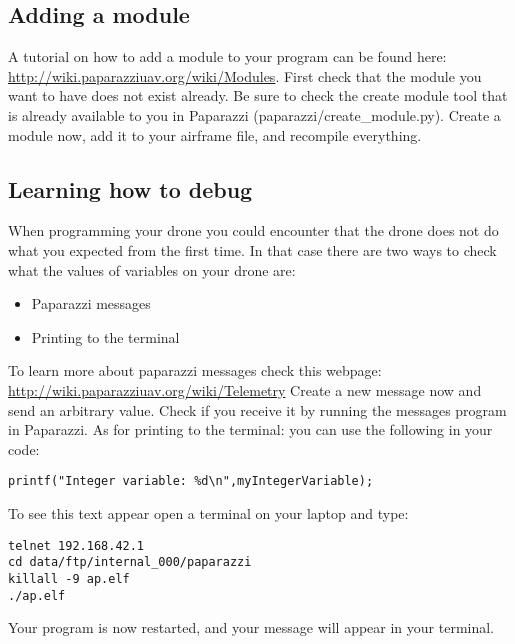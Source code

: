 \documentclass{article}
\begin{document}
\subsection*{Adding a module}
A tutorial on how to add a module to your program can be found here: \url{http://wiki.paparazziuav.org/wiki/Modules}.
First check that the module you want to have does not exist already. Be sure to check the create module tool that is already available to you in Paparazzi (paparazzi/create\_module.py). 
Create a module now, add it to your airframe file, and recompile everything. 

\subsection*{Learning how to debug}
When programming your drone you could encounter that the drone does not do what you expected from the first time. In that case there are two ways to check what the values of variables on your drone are:
\begin{itemize}
	\item Paparazzi messages
	\item Printing to the terminal
\end{itemize}
To learn more about paparazzi messages check this webpage: \url{http://wiki.paparazziuav.org/wiki/Telemetry}
Create a new message now and send an arbitrary value. Check if you receive it by running the messages program in Paparazzi. 
As for printing to the terminal: you can use the following in your code:

\begin{verbatim}
printf("Integer variable: %d\n",myIntegerVariable);
\end{verbatim}
To see this text appear open a terminal on your laptop and type:
\begin{verbatim}
telnet 192.168.42.1
cd data/ftp/internal_000/paparazzi
killall -9 ap.elf 
./ap.elf
\end{verbatim}
Your program is now restarted, and your message will appear in your terminal. 
\end{document}
